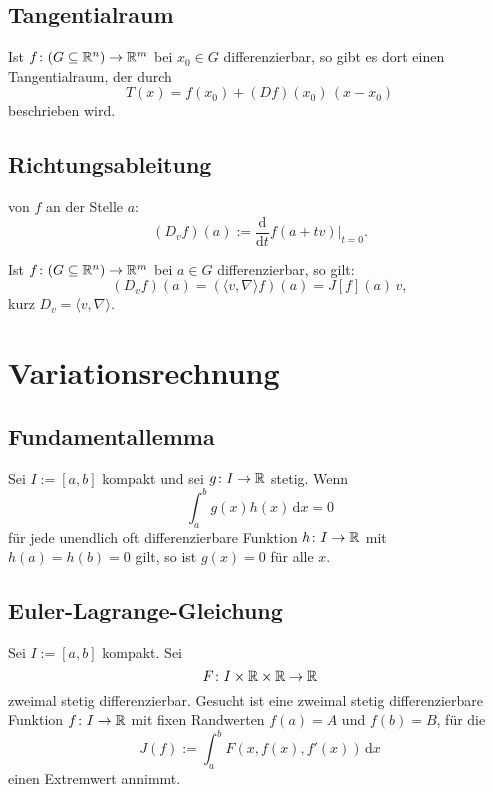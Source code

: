 \subsection{Tangentialraum}
Ist $f\colon (G\subseteq\mathbb R^n)\to\mathbb R^m$ bei $x_0\in G$ differenzierbar,
so gibt es dort einen Tangentialraum, der durch
\begin{equation}
T(x) = f(x_0)+(Df)(x_0)\,(x-x_0)
\end{equation}
beschrieben wird.

\subsection{Richtungsableitung}
\begin{Definition}  von $f$ an der
Stelle $a$:
\begin{equation}
(D_v f)(a) := \frac{\mathrm d}{\mathrm dt}f(a+tv)\Big|_{t=0}.
\end{equation}
\end{Definition}
\noindent
Ist $f\colon (G\subseteq\mathbb R^n)\to\mathbb R^m$ bei $a\in G$ differenzierbar,
so gilt:%
\begin{equation}
(D_v f)(a) = (\langle v,\nabla\rangle f)(a) = J[f](a)\,v,
\end{equation}
kurz $D_v = \langle v,\nabla\rangle$.

\section{Variationsrechnung}

\subsection{Fundamentallemma}

Sei $I:=[a,b]$ kompakt und sei $g\colon I\to\mathbb R$
stetig. Wenn 
\begin{equation}
\int_a^b g(x)h(x)\,\mathrm dx=0
\end{equation}
für jede unendlich oft differenzierbare Funktion $h\colon I\to\mathbb R$
mit $h(a)=h(b)=0$ gilt, so ist $g(x)=0$ für alle $x$.

\subsection{Euler-Lagrange-Gleichung}

Sei $I:=[a,b]$ kompakt. Sei
\begin{equation}
F\colon I\times\mathbb R\times\mathbb R\to\mathbb R
\end{equation}
zweimal stetig differenzierbar. Gesucht ist eine zweimal
stetig differenzierbare Funktion $f\colon I\to\mathbb R$ mit fixen
Randwerten $f(a)=A$ und $f(b)=B$, für die
\begin{equation}
J(f) := \int_a^b F(x,f(x),f'(x))\,\mathrm dx
\end{equation}
einen Extremwert annimmt.

